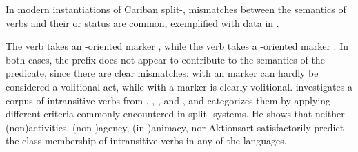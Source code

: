 %
%
%
%


In modern instantiations of Cariban split-, mismatches between the semantics of verbs and their  or  status are common, exemplified with \kalina data in .
%
%
%

%
The  verb   takes an -oriented marker , while the  verb   takes a -oriented marker .
In both cases, the prefix does not appear to contribute to the semantics of the predicate, since there are clear mismatches:
 with an  marker can hardly be considered a volitional act, while   with a  marker is clearly volitional.
\textcite{meira2000split} investigates a corpus of intransitive verbs from \trio, \kalina, \apalai, and \wayana, and categorizes them by applying different criteria commonly encountered in split- systems.
He shows that neither (non\-)activities, %
(non-)agency, %
(in-)animacy, %
nor Aktionsart %
satisfactorily predict the class membership of intransitive verbs in any of the languages.

